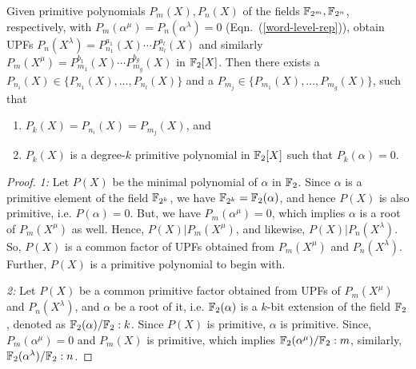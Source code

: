 \begin{small}
\begin{Theorem}\label{thm:Pk}
Given primitive polynomials $P_m(X), P_n(X)$ of the fields ${\mathbb{F}}_{2^m}, {\mathbb{F}}_{2^n}$, respectively, 
with $P_m(\alpha^\mu)=P_n(\alpha^\lambda)= 0$ (Eqn.~(\ref{word-level-rep})), 
obtain UPFs $P_n(X^\lambda) = P_{n_1}^{a_1}(X)\cdots P_{n_l}^{a_l}(X)$ and similarly
$P_{m}(X^\mu)=P_{m_1}^{b_1}(X)\cdots P_{m_g}^{b_g}(X)$ in ${\mathbb{F}}_2[X]$. 
Then there exists a $P_{n_i}(X) \in \{P_{n_1}(X),\dots,P_{n_l}(X)\}$ 
and a $P_{m_j} \in \{P_{m_1}(X),\dots,P_{m_g}(X)\}$, such that
\begin{enumerate}
\item $P_k(X) = P_{n_i}(X) = P_{m_j}(X)$, and
\item $P_k(X)$ is a degree-$k$ primitive polynomial in ${\mathbb{F}}_{2}[X]$
  such that $P_{k}(\alpha)=0$. 
\end{enumerate}
\end{Theorem}
\end{small}

\begin{proof}

{\it 1:} Let $P(X)$ be the minimal polynomial of $\alpha$ in ${\mathbb{F}}_2$. Since $\alpha$ is a primitive element of the field ${\mathbb{F}}_{2^k}$, 
we have ${\mathbb{F}}_{2^k} = {\mathbb{F}}_2(\alpha)$, and hence $P(X)$ is also primitive, i.e. $P(\alpha)=0$. But, we have $P_m(\alpha^\mu)= 0$,  
which implies $\alpha$ is a root of $P_m(X^\mu)$ as well. Hence, $P(X) | P_m(X^\mu)$, and likewise, $P(X) | P_n(X^\lambda)$.
So, $P(X)$ is a common factor of UPFs obtained from $P_{m}(X^\mu)$ and $P_{n}(X^\lambda)$. Further, $P(X)$ is a primitive polynomial to begin with.

{\it 2:} Let $P(X)$ be a common primitive factor obtained from UPFs of $P_{m}(X^\mu)$ and $P_{n}(X^\lambda)$, and $\alpha$ be a root of it, i.e. 
${\mathbb{F}}_2(\alpha)$ is a $k$-bit extension of the field ${\mathbb{F}}_2$, denoted as ${\mathbb{F}}_2(\alpha) / {\mathbb{F}}_2:k$. Since $P(X)$ is primitive, $\alpha$ is primitive.
Since, $P_m(\alpha^\mu)=0$ and $P_m(X)$ is primitive, which implies ${\mathbb{F}}_2(\alpha^\mu) / {\mathbb{F}}_2:m$, similarly, ${\mathbb{F}}_2(\alpha^\lambda) / {\mathbb{F}}_2:n$.  
\end{proof}
